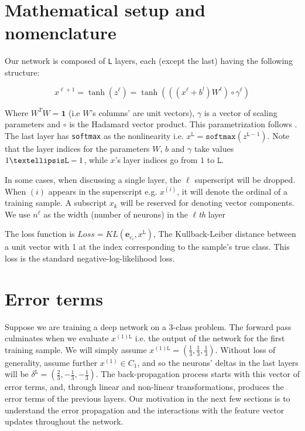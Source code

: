 \documentclass[]{article}
\begin{document}
 	\section{Mathematical setup and nomenclature}
 		Our network is composed of \texttt{L} layers, each (except the last) having the following structure:
 		
 		$$x^{\ell+1} = \tanh(z^\ell) = \tanh(((x^\ell+b^l)W^\ell)\circ \gamma^\ell)$$
 		
 		Where $W^T W=\mathbf{1}$ (i.e $W$'s columns' are unit vectors), $\gamma$ is a vector of scaling parameters and $\circ$ is the Hadamard vector product. This parametrization follows \cite{Weightnorm:4}. The last layer has \texttt{softmax} as the nonlinearity i.e. 
 		$x^\mathtt{L} = \mathtt{softmax}(z^{\mathtt{L}-1})$. 
 		Note that the layer indices for the parameters $W$, $b$ and $\gamma$ take values $1\textellipsis\mathtt{L} -1$, while $x$'s layer indices go from $1$ to $\mathtt{L}$.
 		
 		In some cases, when discussing a single layer, the $\ell$ superscript will be dropped. When $(i)$ appears in the superscript e.g. $x^{(i)}$, it will denote the ordinal of a training sample. A subscript $x_k$ will be reserved for denoting vector components.
 		We use $n^\ell$ as the width (number of neurons) in the $\ell$\textit{th} layer
 		
 		
 		The loss function is $Loss=KL(\mathbf{e}_{c_i},x^\mathtt{L})$, The Kullback-Leiber distance between a unit vector with 1 at the index corresponding to the sample's true class. This loss is the standard negative-log-likelihood loss.
 		
 		
 	\section{Error terms}
 		Suppose we are training a deep network on a 3-class problem. The forward pass culminates when we evaluate $x^{(1)\mathtt{L} }$ i.e. the output of the network for the first training sample. We will simply assume $x^{(1)\mathtt{L} } = \left(\frac{1}{3},\frac{1}{3},\frac{1}{3}\right)$. Without loss of generality, assume further $x^{(1)} \in C_1$, and so the neurons' deltas in the last layers will be  $\delta^{\mathtt{L}}=\left(\frac{2}{3},-\frac{1}{3},-\frac{1}{3}\right)$. 
 		The back-propagation process starts with this vector of error terms, and, through linear and non-linear transformations, produces the error terms of the previous layers. Our motivation in the next few sections is to understand the error propagation and the interactions with the feature vector updates throughout the network. 
	
\end{document}

